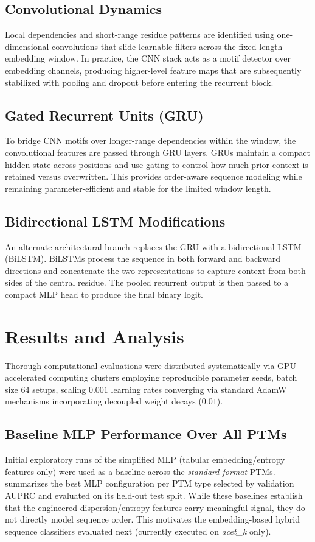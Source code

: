 \documentclass[conference]{IEEEtran}
\begin{document}
\subsection{Convolutional Dynamics}
Local dependencies and short-range residue patterns are identified using one-dimensional convolutions that slide learnable filters across the fixed-length embedding window. In practice, the CNN stack acts as a motif detector over embedding channels, producing higher-level feature maps that are subsequently stabilized with pooling and dropout before entering the recurrent block.

\subsection{Gated Recurrent Units (GRU)}
To bridge CNN motifs over longer-range dependencies within the window, the convolutional features are passed through GRU layers. GRUs maintain a compact hidden state across positions and use gating to control how much prior context is retained versus overwritten. This provides order-aware sequence modeling while remaining parameter-efficient and stable for the limited window length.

\subsection{Bidirectional LSTM Modifications}
An alternate architectural branch replaces the GRU with a bidirectional LSTM (BiLSTM). BiLSTMs process the sequence in both forward and backward directions and concatenate the two representations to capture context from both sides of the central residue. The pooled recurrent output is then passed to a compact MLP head to produce the final binary logit.

\section{Results and Analysis}

Thorough computational evaluations were distributed systematically via GPU-accelerated computing clusters employing reproducible parameter seeds, batch size 64 setups, scaling $0.001$ learning rates converging via standard AdamW mechanisms incorporating decoupled weight decays ($0.01$). 

\subsection{Baseline MLP Performance Over All PTMs}
Initial exploratory runs of the simplified MLP (tabular embedding/entropy features only) were used as a baseline across the \textit{standard-format} PTMs.  summarizes the best MLP configuration per PTM type selected by validation AUPRC and evaluated on its held-out test split. While these baselines establish that the engineered dispersion/entropy features carry meaningful signal, they do not directly model sequence order. This motivates the embedding-based hybrid sequence classifiers evaluated next (currently executed on \textit{acet\_k} only).
\end{document}
